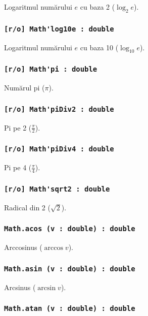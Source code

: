 Logaritmul numărului $e$ cu baza 2 ($\log_{2}{e}$).

\subsubsection{\lstinline|[r/o] Math'log10e : double|}

Logaritmul numărului $e$ cu baza 10 ($\log_{10}{e}$).

\subsubsection{\lstinline|[r/o] Math'pi : double|}

Numărul pi ($\pi$).

\subsubsection{\lstinline|[r/o] Math'piDiv2 : double|}

Pi pe 2 ($\frac{\pi}{2}$).

\subsubsection{\lstinline|[r/o] Math'piDiv4 : double|}

Pi pe 4 ($\frac{\pi}{4}$).

\subsubsection{\lstinline|[r/o] Math'sqrt2 : double|}

Radical din 2 ($\sqrt{2}$).

\subsubsection{\lstinline|Math.acos (v : double) : double|}

Arccosinus ($\arccos{v}$).

\subsubsection{\lstinline|Math.asin (v : double) : double|}

Arcsinus ($\arcsin{v}$).

\subsubsection{\lstinline|Math.atan (v : double) : double|}

